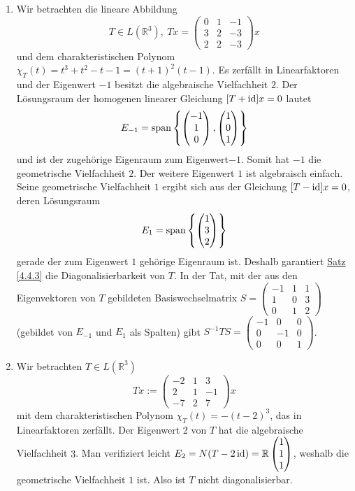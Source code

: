 \begin{enumerate}
\item Wir betrachten die lineare Abbildung 
\[T\in L(\mathbb{R}^3),\ Tx=\begin{pmatrix}0 & 1 & -1\\ 3 & 2 & -3 \\ 2 & 2 & -3\end{pmatrix}x\]
und dem charakteristischen Polynom $\chi _T(t)=t^3+t^2-t-1=(t+1)^2(t-1)$.  Es zerfällt in Linearfaktoren und der Eigenwert $-1$ besitzt die algebraische Vielfachheit $2$.  Der Lösungsraum der homogenen linearer Gleichung $[T+\operatorname{id}]x=0$ lautet
\[E_{-1}=\operatorname{span}\left\{\begin{pmatrix}-1\\ 1\\ 0\end{pmatrix},\begin{pmatrix}1\\ 0\\ 1\end{pmatrix}\right\}\]
und ist der zugehörige Eigenraum zum Eigenwert$-1$.  Somit hat $-1$ die geometrische Vielfachheit $2$.  Der weitere Eigenwert $1$ ist algebraisch einfach.  Seine geometrische Vielfachheit $1$ ergibt sich aus der Gleichung $[T-\operatorname{id}]x=0$, deren Lösungsraum
\[E_1=\operatorname{span}\left\{\begin{pmatrix}1\\ 3\\ 2\end{pmatrix}\right\}\]
gerade der zum Eigenwert $1$ gehörige Eigenraum ist.  Deshalb garantiert \hyperref[4.4.3]{Satz \ref{4.4.3}} die Diagonalisierbarkeit von $T$.  In der Tat, mit der aus den Eigenvektoren von $T$ gebildeten Basiswechselmatrix $S=\begin{pmatrix}-1 & 1 & 1\\ 1 & 0 & 3 \\ 0 & 1 & 2\end{pmatrix}$ (gebildet von $E_{-1}$ und $E_1$ als Spalten) gibt $S^{-1}TS=\begin{pmatrix}-1 & 0 & 0 \\0 & -1 & 0\\ 0 & 0 & 1\end{pmatrix}$.
\item Wir betrachten $T\in L(\mathbb{R}^3)$
\[Tx:=\begin{pmatrix}-2 & 1 & 3\\ 2 & 1 & -1\\ -7 & 2 & 7\end{pmatrix}x\]
mit dem charakteristischen Polynom $\chi _T(t)=-(t-2)^3$, das in Linearfaktoren zerfällt.  Der Eigenwert 2 von $T$ hat die algebraische Vielfachheit $3$.  Man verifiziert leicht $E_2=N(T-2\operatorname{id})=\mathbb{R}\begin{pmatrix}1\\ 1\\ 1\end{pmatrix}$,
weshalb die geometrische Vielfachheit $1$ ist.  Also ist $T$ nicht diagonalisierbar.
\end{enumerate}

